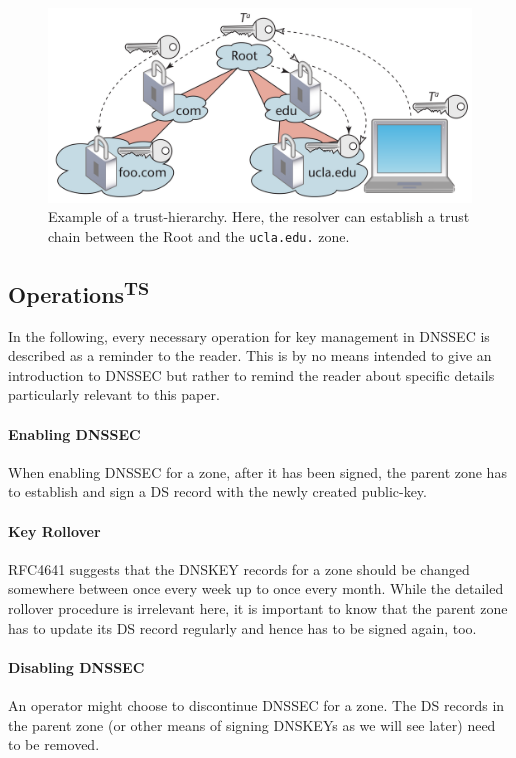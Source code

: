 \documentclass[a4paper,twocolumn]{scrartcl}
\newcommand{\wbts}{\textsuperscript{TS}}
\begin{document}
\begin{figure}
\center
  \includegraphics[width=\linewidth]{trust-chain}
  \caption{Example of a trust-hierarchy. Here, the resolver can establish a trust chain between the Root and the \texttt{ucla.edu.} zone.}
  \label{fig:trust-chain}
\end{figure}


 
\subsection{Operations\wbts}
In the following, every necessary operation for key management in
DNSSEC is described as a reminder to the reader. This is by no means
intended to give an introduction to DNSSEC but rather to remind the
reader about specific details particularly relevant to this paper.

\paragraph{Enabling DNSSEC} When enabling DNSSEC for a zone, after it
has been signed, the parent zone has to establish and sign a DS record
with the newly created public-key.

\paragraph{Key Rollover} RFC4641 \cite{RFC4641} suggests that the DNSKEY
records for a zone should be changed somewhere between once every week
up to once every month. While the detailed rollover procedure is
irrelevant here, it is important to know that the parent zone has to
update its DS record regularly and hence has to be signed again, too.

\paragraph{Disabling DNSSEC} An operator might choose to discontinue
DNSSEC for a zone. The DS records in the parent zone (or other means
of signing DNSKEYs as we will see later) need to be removed.
\end{document}
